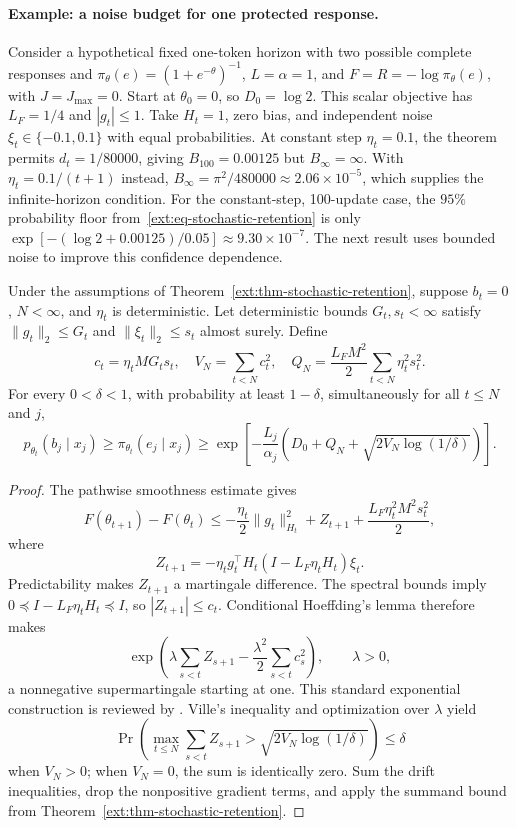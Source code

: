 \paragraph{Example: a noise budget for one protected response.}
Consider a hypothetical fixed one-token horizon with two possible complete
responses and
$\pi_\theta(e)=(1+e^{-\theta})^{-1}$, $L=\alpha=1$, and
$F=R=-\log\pi_\theta(e)$, with $J=J_{\max}=0$. Start at $\theta_0=0$, so
$D_0=\log2$. This scalar objective has $L_F=1/4$ and $|g_t|\le1$.
Take $H_t=1$, zero bias, and independent noise $\xi_t\in\{-0.1,0.1\}$ with
equal probabilities. At constant step $\eta_t=0.1$, the theorem permits
$d_t=1/80000$, giving $B_{100}=0.00125$ but $B_\infty=\infty$.
With $\eta_t=0.1/(t+1)$ instead,
$B_\infty=\pi^2/480000\approx2.06\times10^{-5}$, which supplies the
infinite-horizon condition. For the constant-step, 100-update case, the
$95\%$ probability floor from~\eqref{ext:eq-stochastic-retention} is only
$\exp[-(\log2+0.00125)/0.05]\approx9.30\times10^{-7}$.
The next result uses bounded noise to improve this confidence dependence.

\begin{corollary}
\label{ext:cor-bounded-noise-retention}
Under the assumptions of Theorem~\ref{ext:thm-stochastic-retention},
suppose $b_t=0$, $N<\infty$,
and $\eta_t$ is deterministic. Let deterministic bounds $G_t,s_t<\infty$
satisfy $\|g_t\|_2\le G_t$ and $\|\xi_t\|_2\le s_t$ almost surely. Define
\[
 c_t=\eta_tMG_ts_t,\quad V_N=\sum_{t<N}c_t^2,\quad
 Q_N=\frac{L_FM^2}{2}\sum_{t<N}\eta_t^2s_t^2.
\]
For every $0<\delta<1$, with probability at least $1-\delta$,
simultaneously for all $t\le N$ and $j$,
\begin{equation}
 p_{\theta_t}(b_j\mid x_j)\ge\pi_{\theta_t}(e_j\mid x_j)
 \ge\exp\!\left[-\frac{L_j}{\alpha_j}
   \left(D_0+Q_N+\sqrt{2V_N\log(1/\delta)}\right)\right].
 \label{ext:eq-bounded-noise-retention}
\end{equation}
\end{corollary}
\begin{proof}
The pathwise smoothness estimate gives
\[
 F(\theta_{t+1})-F(\theta_t)
 \le-\frac{\eta_t}{2}\|g_t\|_{H_t}^2+Z_{t+1}
       +\frac{L_F\eta_t^2M^2s_t^2}{2},
\]
where
\[
 Z_{t+1}=-\eta_t g_t^\top H_t(I-L_F\eta_tH_t)\xi_t.
\]
Predictability makes $Z_{t+1}$ a martingale difference. The spectral bounds
imply $0\preceq I-L_F\eta_tH_t\preceq I$, so $|Z_{t+1}|\le c_t$.
Conditional Hoeffding's lemma therefore makes
\[
 \exp\!\left(\lambda\sum_{s<t}Z_{s+1}
              -\frac{\lambda^2}{2}\sum_{s<t}c_s^2\right),\qquad\lambda>0,
\]
a nonnegative supermartingale starting at one. This standard exponential
construction is reviewed by \citet{howard2020timeuniform}. Ville's inequality
and optimization over $\lambda$ yield
\[
 \Pr\!\left(\max_{t\le N}\sum_{s<t}Z_{s+1}
              >\sqrt{2V_N\log(1/\delta)}\right)\le\delta
\]
when $V_N>0$; when $V_N=0$, the sum is identically zero. Sum the drift inequalities, drop the nonpositive gradient terms,
and apply the summand bound from Theorem~\ref{ext:thm-stochastic-retention}.
\end{proof}

